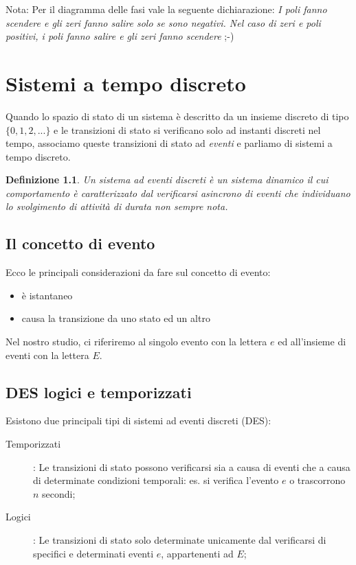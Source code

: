 \documentclass[a4paper]{report}
\newtheorem{definizione}{Definizione}
\begin{document}
Nota: Per il diagramma delle fasi vale la seguente dichiarazione:
{\em I poli fanno scendere e gli zeri fanno salire solo se sono
  negativi. Nel caso di zeri e poli positivi, i poli fanno salire e
                     gli zeri fanno scendere} ;-)


\chapter{Sistemi a tempo discreto}
Quando lo spazio di stato di un sistema \`e descritto da un insieme
discreto di tipo $\{0, 1, 2, ...\}$ e le transizioni di stato si
verificano solo ad instanti discreti nel tempo, associamo queste
transizioni di stato ad {\em eventi} e parliamo di
sistemi a tempo discreto.

\begin{definizione}\label{def:des}
  Un sistema ad eventi discreti \`e un sistema dinamico il cui
  comportamento \`e caratterizzato dal verificarsi asincrono di eventi
  che individuano lo svolgimento di attivit\`a di durata non sempre nota.
\end{definizione}

\section{Il concetto di evento}
Ecco le principali considerazioni da fare sul concetto di evento:
\begin{itemize}
\item \`e istantaneo
\item causa la transizione da uno stato ed un altro
\end{itemize}

Nel nostro studio, ci riferiremo al singolo evento con la lettera $e$
ed all'insieme di eventi con la lettera $E$.

\section{DES logici e temporizzati}
Esistono due principali tipi di sistemi ad eventi discreti (DES):
\begin{description}
\item[Temporizzati]:
  Le transizioni di stato possono verificarsi sia a causa di eventi
  che a causa di determinate condizioni temporali: es. si verifica
  l'evento $e$ o trascorrono $n$ secondi;
\item [Logici]:
  Le transizioni di stato solo determinate unicamente dal verificarsi
  di specifici e determinati eventi $e$, appartenenti ad $E$;
\end{description}
\end{document}
